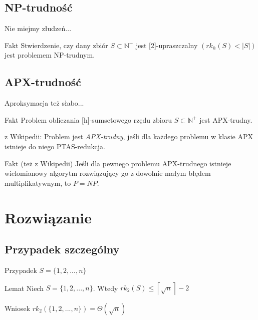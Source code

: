 \documentclass{beamer}
\newcommand{\N}{\mathbb{N}}
\begin{document}
	\subsection{NP-trudność}
		\begin{frame}{Nie miejmy złudzeń...}
			\begin{exampleblock}{Fakt}
				Stwierdzenie, czy dany zbiór $ S \subset \N^{+} $ jest [2]-upraszczalny $ \left( rk_{h}(S) < |S| \right) $ jest problemem NP-trudnym.
			\end{exampleblock}
		\end{frame}
		
	\subsection{APX-trudność}
		\begin{frame}{Aproksymacja też słabo...}
			\begin{exampleblock}{Fakt}
				Problem obliczania [h]-sumsetowego rzędu zbioru $ S \subset \N^{+} $ jest APX-trudny.
			\end{exampleblock}			
			
			\pause
			\begin{block}{z Wikipedii:}
				Problem jest \emph{APX-trudny}, jeśli dla każdego problemu w klasie APX istnieje do niego PTAS-redukcja.
			\end{block}						
			
			\pause
			\begin{exampleblock}{Fakt (też z Wikipedii)}
				Jeśli dla pewnego problemu APX-trudnego istnieje wielomianowy algorytm rozwiązujący go z dowolnie małym błędem multiplikatywnym, to $ P = NP $.
			\end{exampleblock}
			
		\end{frame}
		
\section{Rozwiązanie}
	\subsection{Przypadek szczególny}
		\begin{frame}{Przypadek $ S = \lbrace 1,2,...,n \rbrace $}
			\begin{exampleblock}{Lemat}			
				Niech $ S = \lbrace 1,2,...,n \rbrace $. Wtedy $ rk_{2}(S) \leq \left\lceil \sqrt{n} \right\rceil - 2 $
			\end{exampleblock}
						
			
			\pause			
			\vspace{\baselineskip}
			\begin{exampleblock}{Wniosek}			
				$ rk_{2}\left( \lbrace 1,2,...,n \rbrace \right) = \Theta(\sqrt{n}) $
			\end{exampleblock}
		\end{frame}
		
\end{document}

